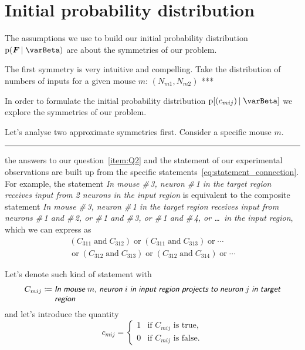 \documentclass[\ifafour a4paper,12pt,\else a5paper,10pt,\fi%
onecolumn,oneside,article,%
british%
]{memoir}
\theoremstyle{remark}
\theoremstyle{innote}
\newcommand*{\defd}{\coloneqq}
\newcommand*{\pf}{\mathrm{p}}%
\renewcommand*{\|}[1][]{\nonscript\,#1\vert\nonscript\;\mathopen{}}
\newcommand*{\yI}{\varBeta}
\newcommand*{\yC}{C}
\newcommand*{\yc}{c}
\newcommand*{\statm}[1]{\textsl{\textsf{#1}}}
\newcommand*{\yN}{N}
\newcommand*{\yF}{\bm{F}}
\begin{document}
\section{Initial probability distribution}
\label{sec:init_prob}

The assumptions we use to build our initial probability distribution
$\pf(\yF \| \yI)$ are about the symmetries of our problem.

The first symmetry is very intuitive and compelling. Take the distribution
of numbers of inputs for a given mouse $m$: $(\yN_{m1}, \yN_{m2})$ ***



In order to formulate the initial probability distribution $\pf[(\yc_{mij})
\| \yI]$ we explore the symmetries of our problem.

Let's analyse two approximate symmetries first. Consider a specific mouse
$m$.




\clearpage
\hrule




the answers to our
question~\ref{item:Q2} and the statement of our experimental observations
are built up from the specific statements~\eqref{eq:statement_connection}.
For example, the statement \statm{In mouse \#\,3, neuron \#\,1 in the
  target region receives input from 2 neurons in the input region} is
equivalent to the composite statement \statm{In mouse \#\,3, neuron \#\,1
  in the target region receives input from neurons \#\,1 and \#\,2, or
  \#\,1 and \#\,3, or \#\,1 and \#\,4, or \ldots\ in the input region},
which we can express as
\begin{multline}
  (\yC_{311} \mathbin{\text{and}} \yC_{312}) \mathbin{\text{or}}
  (\yC_{311} \mathbin{\text{and}} \yC_{313}) \mathbin{\text{or}}
  \dotsb{}\\ {}\mathbin{\text{or}}
  (\yC_{312} \mathbin{\text{and}} \yC_{313}) \mathbin{\text{or}}
  (\yC_{312} \mathbin{\text{and}} \yC_{314}) \mathbin{\text{or}}
  \dotsb{}
\end{multline}





 Let's denote such kind of statement with
\begin{equation}
  \label{eq:statement_connection}
  \yC_{mij} \defd \parbox[t]{0.8\linewidth}{\statm{In mouse $m$, neuron $i$ in input region projects to neuron $j$ in target region}}
\end{equation}
and let's introduce the quantity
\begin{equation}
  \label{eq:quantity_connection}
  \yc_{mij} =
  \begin{cases}
    1&\text{if $\yC_{mij}$ is true},\\
    0&\text{if $\yC_{mij}$ is false}.
  \end{cases}
\end{equation}
\end{document}
